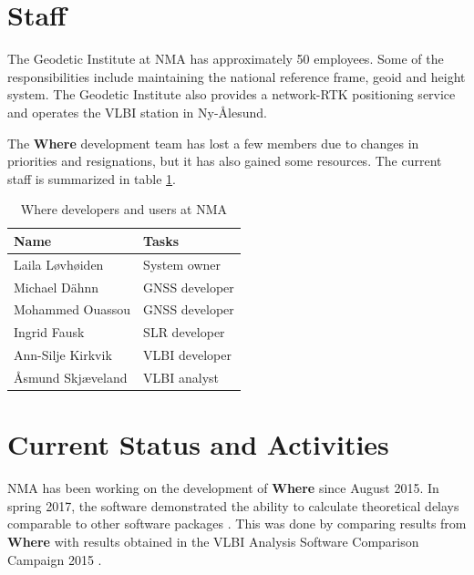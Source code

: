 \documentclass[twocolumn,twoside]{svmultivs_br} %
\begin{document}
\section{Staff}
The Geodetic Institute at NMA has approximately 50 employees. Some of the responsibilities include maintaining the
national reference frame, geoid and height system. The Geodetic Institute also provides a network-RTK positioning
service and operates the VLBI station in Ny-\AA lesund.

The \textbf{Where} development team has lost a few members due to changes in priorities and resignations, but it has
also gained some resources. The current staff is summarized in table \ref{tab:staff}.

\begin{table}[htb!]
\caption{Where developers and users at NMA}
\begin{center}
\begin{tabularx}{\linewidth}{X|X}
\hline
Name  & Tasks \\
\hline
Laila L\o vh\o iden & System owner \\
Michael D\"ahnn & GNSS developer \\
Mohammed Ouassou & GNSS developer \\
Ingrid Fausk & SLR developer \\
Ann-Silje Kirkvik & VLBI developer \\
\AA smund Skj\ae veland & VLBI analyst \\
\hline
\end{tabularx}
\end{center}
\label{tab:staff}
\end{table}


\section{Current Status and Activities}

NMA has been working on the development of \textbf{Where} since August 2015. In spring 2017, the software demonstrated
the ability to calculate theoretical delays comparable to other software packages \cite{kirkvik2017}. This was done by
comparing results from \textbf{Where} with results obtained in the VLBI Analysis Software Comparison Campaign 2015
\cite{klopotek2016}.
\end{document}
